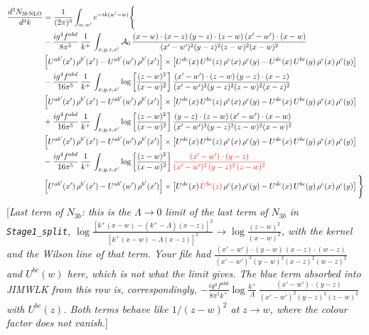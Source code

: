 \documentclass[9pt]{article}
\numberwithin{equation}{section}
\newcommand{\chg}[1]{{\color{red}#1}}
\newcommand{\rnote}[1]{{\color{teal}[\textit{#1}]}}
\begin{document}
\begin{align}
\frac{d^{3}N_{3b\,\rm NLO}}{d^{3}k} & = \frac{1}{(2\pi)^{3}}\int_{w,w'}e^{-ik(w'-w)}\Bigg\{\notag \\
&-\frac{ig^{4}f^{abd}}{8\pi^{5}}\,\frac{1}{k^{+}}\,\int_{x,y,z,x'}\mathcal{A}_{0}\,
\frac{(x-w)\cdot(x-z)\,(y-z)\cdot(z-w)\,(x'-w')\cdot(x-w)}{(x'-w')^{2}(y-z)^{2}(z-w)^{2}(x-w)^{2}}\notag \\ & \left[U^{ab'}(x')\,\rho^{b'}(x')-U^{ab'}(w')\, \rho^{b'}(x')\right]\times \left[U^{de}(x)\,U^{bc}(z)\, \rho^{e}(x)\,\rho^{c}(y)-U^{de}(x)\,U^{bc}(y)\,\rho^{e}(x)\,\rho^{c}(y)\right] \notag \\
& -\frac{ig^{4}f^{abd}}{16\pi^{5}}\,\frac{1}{k^{+}}\,\int_{x,y,z,x'}\log{\left[\frac{(z-w)^{2}}{(x-w)^{2}}\right]}\,
\frac{(x'-w')\cdot(z-w)\,(y-z)\cdot(x-z)}{(x'-w')^{2}(y-z)^{2}(z-w)^{2}(x-z)^{2}}\notag \\
&\left[U^{ab'}(x')\,\rho^{b'}(x')-U^{ab'}(w')\, \rho^{b'}(x')\right]\times \left[U^{de}(x)\,U^{bc}(z)\, \rho^{e}(x)\,\rho^{c}(y)-U^{de}(x)\,U^{bc}(y)\,\rho^{e}(x)\,\rho^{c}(y)\right] \notag \\
&+ \frac{ig^{4}f^{abd}}{16\pi^{5}}\,\frac{1}{k^{+}}\,\int_{x,y,z,x'}\log{\left[\frac{(z-w)^{2}}{(x-w)^{2}}\right]}\,
\frac{(y-z)\cdot(z-w)\,(x'-w')\cdot(x-w)}{(x'-w')^{2}(y-z)^{2}(z-w)^{2}(x-w)^{2}}\notag \\ 
& \left[U^{ab'}(x')\,\rho^{b'}(x')-U^{ab'}(w')\, \rho^{b'}(x')\right]\times \left[U^{de}(x)\,U^{bc}(z)\, \rho^{e}(x)\,\rho^{c}(y)-U^{de}(x)\,U^{bc}(y)\,\rho^{e}(x)\,\rho^{c}(y)\right]\notag \\ & -\frac{ig^{4}f^{abd}}{16\pi^{5}}\,\frac{1}{k^{+}}\,\int_{x,y,z,x'}\log{\left[\frac{(z-w)^{2}}{(x-w)^{2}}\right]}\,\chg{\frac{(x'-w')\cdot(y-z)}{(x'-w')^{2}\,(y-z)^{2}\,(z-w)^{2}}}\notag \\ & \left[U^{ab'}(x')\,\rho^{b'}(x')-U^{ab'}(w')\, \rho^{b'}(x')\right]\times \left[U^{de}(x)\,\chg{U^{bc}(z)}\, \rho^{e}(x)\,\rho^{c}(y)-U^{de}(x)\,U^{bc}(y)\,\rho^{e}(x)\,\rho^{c}(y)\right]\Bigg\}
\end{align}
\rnote{Last term of $N_{3b}$: this is the $\Lambda\to0$ limit of the last term of $N_{3b}$ in \texttt{Stage1\_split}, $\log\frac{[k^{+}(x-w)-(k^{+}-\Lambda)(x-z)]^{2}}{[k^{+}(x-w)-\Lambda(x-z)]^{2}}\to\log\frac{(z-w)^{2}}{(x-w)^{2}}$, with the kernel and the Wilson line of that term. Your file had $\frac{(x'-w')\cdot(y-w)\,(x-z)\cdot(w-z)}{(x'-w')^{2}(y-w)^{2}(x-z)^{2}(w-z)^{2}}$ and $U^{bc}(w)$ here, which is not what the limit gives. The blue term absorbed into JIMWLK from this row is, correspondingly, $-\frac{ig^{4}f^{abd}}{8\pi^{5}k^{+}}\log\frac{k^{+}}{\Lambda}\,\frac{(x'-w')\cdot(y-z)}{(x'-w')^{2}(y-z)^{2}(z-w)^{2}}$ with $U^{bc}(z)$. Both terms behave like $1/(z-w)^{2}$ at $z\to w$, where the colour factor does not vanish.}
\end{document}
